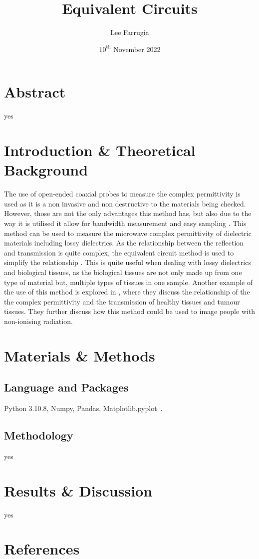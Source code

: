 \documentclass[12pt, a4paper]{article}
\title{Equivalent Circuits}
\date{\(10^\mathrm{{th}}\) November 2022}
\author{Lee Farrugia}
\begin{document}
    
\maketitle
\thispagestyle{titlepagestyle}
\pagestyle{mystyle}

\section{Abstract}
yes

\begin{multicols*}{2}

\section{Introduction \& Theoretical Background}
The use of open-ended coaxial probes to measure the complex permittivity is used as it is a non invasive and non destructive to the materials being checked. However, those are not the only advantages this method has, but also due to the way it is utilised it allow for bandwidth measurement and easy sampling \parencite{liao2011accurate}. This method can be used to measure the microwave complex permittivity of dielectric materials including lossy dielectrics. As the relationship between the reflection and transmission is quite complex, the equivalent circuit method is used to simplify the relationship \parencite{stuchly1982equivalent}. This is quite useful when dealing with lossy dielectrics and biological tissues, as the biological tissues are not only made up from one type of material but, multiple types of tissues in one sample. Another example of the use of this method is explored in \cite{zajivcek2006evaluation}, where they discuss the relationship of the the complex permittivity and the transmission of healthy tissues and tumour tissues. They further discuss how this method could be used to image people with non-ionising radiation.

\section{Materials \& Methods}
\subsection{Language and Packages}
Python 3.10.8, Numpy, Pandas, Matplotlib.pyplot \,.
\subsection{Methodology}
yes

\section{Results \& Discussion}
yes

\end{multicols*}

\section{References}
\printbibliography[heading = none]
\end{document}
